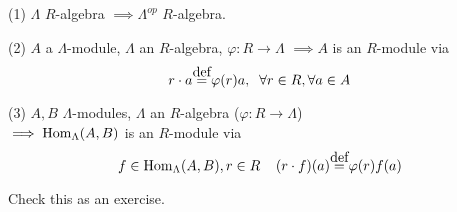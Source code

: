 \begin{note}
(1) $\Lambda$ $R$-algebra $\implies \Lambda^{op}$ $R$-algebra.

(2) $A$ a $\Lambda$-module, $\Lambda$ an $R$-algebra, $\varphi\colon
R \to \Lambda$ 
$\implies A$ is an $R$-module via \[r\cdot a
\stackrel{\mathclap{\normalfont\mbox{def}}}{=} \varphi(r)a, \;\;
\forall r \in R, \forall a \in A\] 


(3) $A,B$ $\Lambda$-modules, $\Lambda$ an $R$-algebra ($\varphi\colon R\to\Lambda$)\\
$\implies  \operatorname{Hom}_\Lambda(A,B)$ is an $R$-module via \[f \in  \Hom_\Lambda(A,B), r \in R \;\;\;\; (r \cdot f)(a) \stackrel{\mathclap{\normalfont\mbox{def}}}{=} \varphi(r)f(a)\]

Check this as an exercise.
\end{note}

